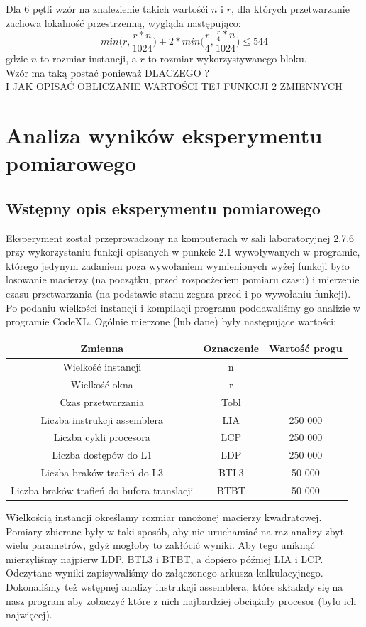 \documentclass[10pt,a4paper]{article}
\begin{document}
Dla 6 pętli wzór na znalezienie takich wartośći $n$ i $r$, dla których przetwarzanie zachowa
lokalność przestrzenną, wygląda następująco:
$$
    min\Big(r, \frac{r*n}{1024}\Big) + 2*min\Big(\frac{r}{4}, \frac{\frac{r}{4} * n}{1024}\Big) \leq 544
$$
gdzie $n$ to rozmiar instancji, a $r$ to rozmiar wykorzystywanego bloku.\\
Wzór ma taką postać ponieważ DLACZEGO ? \\ I JAK OPISAĆ OBLICZANIE WARTOŚCI TEJ FUNKCJI 2 ZMIENNYCH
\\
\section{Analiza wyników eksperymentu pomiarowego}
\subsection{Wstępny opis eksperymentu pomiarowego}
Eksperyment został przeprowadzony na komputerach w sali laboratoryjnej 2.7.6 przy
wykorzystaniu funkcji opisanych w punkcie 2.1 wywoływanych w programie, którego jedynym
zadaniem poza wywołaniem wymienionych wyżej funkcji było losowanie macierzy
(na początku, przed rozpocżeciem pomiaru czasu) i mierzenie czasu przetwarzania
(na podstawie stanu zegara przed i po wywołaniu funkcji). Po podaniu wielkości instancji
i kompilacji programu poddawaliśmy go analizie w programie CodeXL. Ogólnie mierzone (lub dane)
były następujące wartości:
\begin{center}
    \begin{tabular}{ |c|c|c| }
        \hline
        Zmienna & Oznaczenie & Wartość progu \\
        \hline
        Wielkość instancji & n &  \\
        Wielkość okna & r &  \\
        Czas przetwarzania & Tobl &  \\
        Liczba instrukcji assemblera & LIA &  250 000\\
        Liczba cykli procesora & LCP & 250 000 \\
        Liczba dostępów do L1 & LDP & 250 000 \\
        Liczba braków trafień do L3 & BTL3 & 50 000 \\
        Liczba braków trafień do bufora translacji & BTBT & 50 000 \\
        \hline
    \end{tabular}
\end{center}
Wielkością instancji określamy rozmiar mnożonej macierzy kwadratowej.\\
Pomiary zbierane były w taki sposób, aby nie uruchamiać na raz analizy zbyt wielu
parametrów, gdyż mogłoby to zakłócić wyniki. Aby tego uniknąć mierzyliśmy najpierw 
LDP, BTL3 i BTBT, a dopiero później LIA i LCP. Odczytane wyniki zapisywaliśmy do 
załączonego arkusza kalkulacyjnego. Dokonaliśmy też wstępnej analizy instrukcji
assemblera, które składały się na nasz program aby zobaczyć które z nich najbardziej
obciążały procesor (było ich najwięcej).
\end{document}
